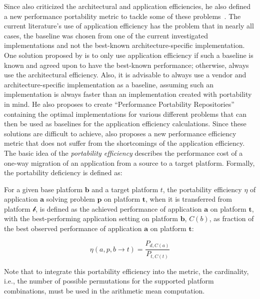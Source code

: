 Since \citeauthor{marowka_portability_2024} also criticized the architectural and application efficiencies, he also defined a new performance portability metric to tackle some of these problems~\cite{marowka_portability_2024}. 
The current literature's use of application efficiency has the problem that in nearly all cases, the baseline was chosen from one of the current investigated implementations and not the best-known architecture-specific implementation. 
One solution proposed by \citeauthor{marowka_portability_2024} is to only use application efficiency if such a baseline is known and agreed upon to have the best-known performance; otherwise, always use the architectural efficiency. 
Also, it is advisable to always use a vendor and architecture-specific implementation as a baseline, assuming such an implementation is always faster than an implementation created with portability in mind. 
He also proposes to create \enquote{Performance Portability Repositories} containing the optimal implementations for various different problems that can then be used as baselines for the application efficiency calculations. 
Since these solutions are difficult to achieve, \citeauthor{marowka_portability_2024} also proposes a new performance efficiency metric that does not suffer from the shortcomings of the application efficiency.
The basic idea of the \textit{portability efficiency} describes the performance cost of a one-way migration of an application from a source to a target platform. 
Formally, the portability deficiency is defined as: 

\begin{definition}\label{def:pp_eff}
For a given base platform $\mathbf{b}$ and a target platform $t$, the portability efficiency $\eta$ of application $\mathbf{a}$ solving problem $\mathbf{p}$ on platform $\mathbf{t}$, when it is transferred from platform $\mathcal{b}$, is defined as the achieved performance of application $\mathbf{a}$ on platform $\mathbf{t}$, with the best-performing application setting on platform $\mathbf{b}$, $C(b)$, as fraction of the best observed performance of application $\mathbf{a}$ on platform $\mathbf{t}$:

\[
    \eta(a, p, b \rightarrow t) = \frac{P_{d, C(a)}}{P_{t, C(t)}}
\]
\end{definition}
Note that to integrate this portability efficiency into the \mpp metric, the cardinality, i.e., the number of possible permutations for the supported platform combinations, must be used in the arithmetic mean computation. 
